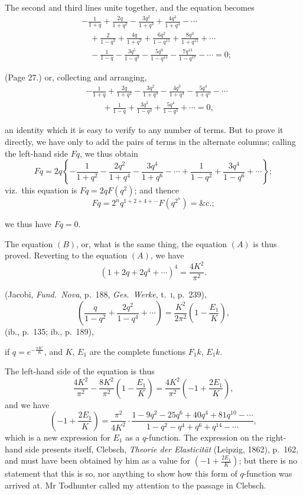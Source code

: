 \documentclass[11pt,a4paper]{article}
\begin{document}
The second and third lines unite together, and the equation becomes
\begin{align*}
& -\frac{1}{1 + q} + \frac{2q}{1 + q^2} - \frac{3q^2}{1 + q^3} + \frac{4q^3}{1 + q^4} - \cdots \\
& \quad + \frac{2}{1 - q^3} + \frac{4q}{1 + q^7} + \frac{6q^2}{1 - q^{11}} + \frac{8q^3}{1 + q^{15}} + \cdots \\
& \quad - \frac{1}{1 - q} - \frac{3q^5}{1 - q^9} - \frac{5q^9}{1 - q^{13}} - \frac{7q^{13}}{1 - q^{17}} - \cdots = 0;
\end{align*}

\bigskip

\noindent (Page 27.) or, collecting and arranging,
\begin{align*}
& -\frac{1}{1 + q} + \frac{2q}{1 + q^2} - \frac{3q^2}{1 + q^3} - \frac{4q^3}{1 + q^4} - \frac{5q^4}{1 + q^5} - \cdots \\
& \qquad + \frac{1}{1 - q} + \frac{3q^2}{1 - q^3} + \frac{5q^4}{1 - q^5} + \cdots = 0,
\end{align*}

an identity which it is easy to verify to any number of terms. But to prove it directly, we have only to add the pairs of terms in the alternate columns; calling the left-hand side $Fq$, we thus obtain
\[
Fq = 2q \left\{ -\frac{1}{1 + q^2} - \frac{2q^2}{1 + q^4} - \frac{3q^4}{1 + q^6} - \cdots
+ \frac{1}{1 - q^2} + \frac{3q^4}{1 - q^6} + \cdots \right\};
\]
viz.\ this equation is $Fq = 2qF(q^2)$; and thence
\[
Fq = 2^n q^{1 + 2 + 4 + \cdots} F(q^{2^n}) = \&\text{c.};
\]

we thus have $Fq = 0$.

The equation $(B)$, or, what is the same thing, the equation $(A)$ is thus proved. Reverting to the equation $(A)$, we have
\[
(1 + 2q + 2q^4 + \cdots)^4 = \frac{4 K^2}{\pi^2}.
\]

\noindent (Jacobi, \textit{Fund.\ Nova}, p.\ 188, \textit{Ges.\ Werke}, t.\ \textsc{i}, p.\ 239),
\[
\left( \frac{q}{1 - q^2} + \frac{2q^2}{1 - q^4} + \cdots \right) = \frac{K^2}{2\pi^2} \left( 1 - \frac{E_1}{K} \right),
\]
\hfill (ib., p.\ 135; ib., p.\ 189),

\noindent if $q = e^{-\frac{\pi K'}{K}}$, and $K$, $E_1$ are the complete functions $F_1k$, $E_1k$.

The left-hand side of the equation is thus
\[
\frac{4 K^2}{\pi^2} - \frac{8 K^2}{\pi^2} \left( 1 - \frac{E_1}{K} \right) = \frac{4 K^2}{\pi^2} \left( -1 + \frac{2 E_1}{K} \right),
\]
and we have
\[
\left( -1 + \frac{2 E_1}{K} \right) = \frac{\pi^2}{4 K^2} \cdot \frac{1 - 9q^2 - 25q^6 + 40q^4 + 81q^{10} - \cdots}{1 - q^2 - q^4 + q^6 + q^{14} - \cdots},
\]
which is a new expression for $E_1$ as a $q$-function. The expression on the right-hand side presents itself, Clebsch, \textit{Theorie der Elasticit\"at} (Leipzig, 1862), p.\ 162, and must have been obtained by him as a value for $\left( -1 + \frac{2 E_1}{K} \right)$; but there is no statement that this is so, nor anything to show how this form of $q$-function was arrived at. Mr Todhunter called my attention to the passage in Clebsch.
\end{document}
